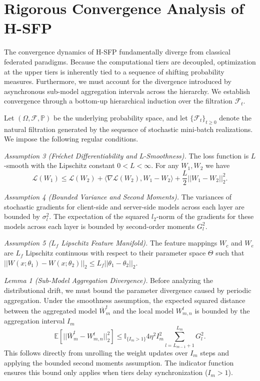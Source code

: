 \section{Rigorous Convergence Analysis of H-SFP}
\label{app:appendix_convergence}

The convergence dynamics of H-SFP fundamentally diverge from classical federated paradigms. Because the computational tiers are decoupled, optimization at the upper tiers is inherently tied to a sequence of shifting probability measures. Furthermore, we must account for the divergence introduced by asynchronous sub-model aggregation intervals across the hierarchy. We establish convergence through a bottom-up hierarchical induction over the filtration $\mathcal{F}_t$.

Let $(\Omega, \mathcal{F}, \mathbb{P})$ be the underlying probability space, and let $\{\mathcal{F}_t\}_{t \ge 0}$ denote the natural filtration generated by the sequence of stochastic mini-batch realizations. We impose the following regular conditions.

\noindent\textit{Assumption 3 (Fréchet Differentiability and L-Smoothness).} The loss function is $L$-smooth with the Lipschitz constant $0 < L < \infty$. For any $W_1, W_2$ we have
\begin{equation}
\mathcal{L}(W_1) \le \mathcal{L}(W_2) + \langle \nabla \mathcal{L}(W_2), W_1 - W_2 \rangle + \frac{L}{2} ||W_1 - W_2||_2^2.
\end{equation}

\noindent\textit{Assumption 4 (Bounded Variance and Second Moments).} The variances of stochastic gradients for client-side and server-side models across each layer are bounded by $\sigma_l^2$. The expectation of the squared $l_2$-norm of the gradients for these models across each layer is bounded by second-order moments $G_l^2$.

\noindent\textit{Assumption 5 ($L_f$ Lipschitz Feature Manifold).} The feature mappings $W_c$ and $W_e$ are $L_f$ Lipschitz continuous with respect to their parameter space $\Theta$ such that $||W(x; \theta_1) - W(x; \theta_2)||_2 \le L_f ||\theta_1 - \theta_2||_2$.

\noindent\textit{Lemma 1 (Sub-Model Aggregation Divergence).} Before analyzing the distributional drift, we must bound the parameter divergence caused by periodic aggregation. Under the smoothness assumption, the expected squared distance between the aggregated model $\overline{W}_m^t$ and the local model $W_{m,n}^t$ is bounded by the aggregation interval $I_m$
\begin{equation}
\mathbb{E}[||\overline{W}_m^t - W_{m,n}^t||_2^2] \le \mathbb{I}_{\{I_m>1\}} 4\eta^2 I_m^2 \sum_{l=L_{m-1}+1}^{L_m} G_l^2.
\end{equation}
This follows directly from unrolling the weight updates over $I_m$ steps and applying the bounded second moments assumption. The indicator function ensures this bound only applies when tiers delay synchronization ($I_m > 1$).

